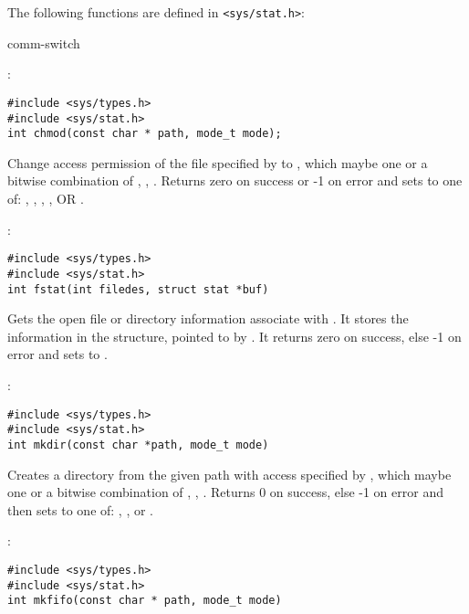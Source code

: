 The following functions are defined in \verb+<sys/stat.h>+:
\begin{Ventry2}{comm-switch  }

\item[chmod]
\label{item:chmod}
:
\begin{production}
\begin{verbatim}
#include <sys/types.h>
#include <sys/stat.h>
int chmod(const char * path, mode_t mode);   
\end{verbatim}
\end{production}

Change access permission of the file specified by  to 
, which maybe one or a bitwise combination of
, , . 
Returns zero on success or -1 on error and sets
 to one of: , ,
, ,  OR .


\item[fstat]
\label{item:fstat}
:
\begin{production}
\begin{verbatim}
#include <sys/types.h> 
#include <sys/stat.h> 
int fstat(int filedes, struct stat *buf)
\end{verbatim}
\end{production}

Gets the open file or directory information associate with
. It stores the information in the  structure,
pointed to by . It returns zero on success,  else -1 on error and
sets  to .
 
\item[mkdir]
\label{item:mkdir}
:
\begin{production}
\begin{verbatim}
#include <sys/types.h>
#include <sys/stat.h>
int mkdir(const char *path, mode_t mode) 
\end{verbatim}
\end{production}

Creates a directory from the given path with access specified by
, which maybe one or a bitwise combination of
, , .  
Returns 0 on success, else -1 on error and then sets  to one of:
, ,
 or .

\item[mkfifo]
\label{item:mkfifo}
:
\begin{production}
\begin{verbatim}
#include <sys/types.h> 
#include <sys/stat.h> 
int mkfifo(const char * path, mode_t mode)
\end{verbatim}
\end{production}


\end{Ventry2}
